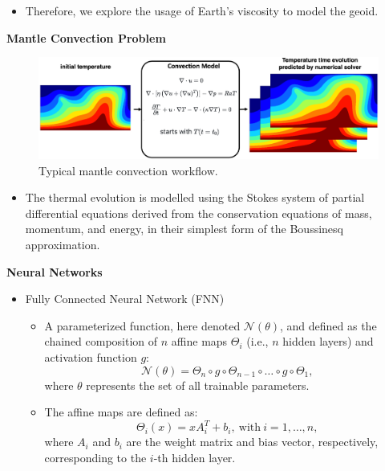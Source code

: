 {\begin{itemize}
     \item Therefore, we explore the usage of Earth's viscosity to model the geoid.
\end{itemize}

\textbf{Mantle Convection Problem}

\begin{figure}[H]
    \includegraphics[width=\linewidth]{figures/Mantle_Convection_workflow.png}
    \caption{Typical mantle convection workflow.}
\end{figure}
\vspace{-2ex}
\begin{itemize}
    \item The thermal evolution is modelled using the Stokes system of partial differential equations derived from the conservation equations of mass, momentum, and energy, in their simplest form of the Boussinesq approximation. 
\end{itemize}

\textbf{Neural Networks}
\begin{itemize}
    \item Fully Connected Neural Network (FNN)
            \begin{itemize} 
                \item A parameterized function, here denoted $\mathcal{N}(\theta)$, and defined as the chained composition of $n$ affine maps $\Theta_i$ (i.e., $n$ hidden layers) and activation function $g$:
            \begin{equation*}
            \mathcal{N}(\theta) = \Theta_n \circ g \circ \Theta_{n-1} \circ \ldots \circ g \circ \Theta_1,
            \end{equation*}
            where $\theta$ represents the set of all trainable parameters.
               \item The affine maps are defined as:
		       \begin{equation*} \Theta_i(x) = xA_i^{T} + b_i, \ \mathrm{with} \ i=1,\ldots,n, \end{equation*}
            where $A_i$ and $b_i$ are the weight matrix and bias vector, respectively, corresponding to the $i$-th hidden layer.
        \end{itemize}


\end{itemize}}
